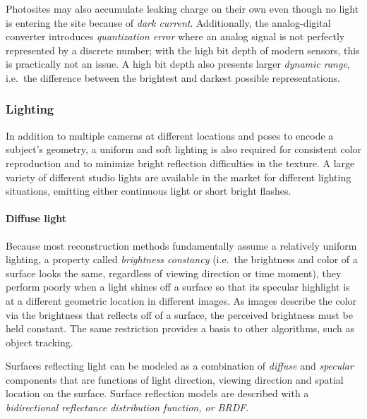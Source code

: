 Photosites may also accumulate leaking charge on their own even though no light is entering the site because of \emph{dark current}.
Additionally, the analog-digital converter introduces \emph{quantization error} where an analog signal is not perfectly represented by a discrete number; with the high bit depth of modern sensors, this is practically not an issue.
A high bit depth also presents larger \emph{dynamic range}, i.e.\ the difference between the brightest and darkest possible representations.
\cite{el2005cmos,litwiller2001ccd}



\subsubsection{Lighting} \label{sec:bg-lighting} %

In addition to multiple cameras at different locations and poses to encode a subject's geometry, a uniform and soft lighting is also required for consistent color reproduction and to minimize bright reflection difficulties in the texture.
A large variety of different studio lights are available in the market for different lighting situations, emitting either continuous light or short bright flashes.

\paragraph{Diffuse light}
Because most reconstruction methods fundamentally assume a relatively uniform lighting, a property called \emph{brightness constancy} (i.e.\ the brightness and color of a surface looks the same, regardless of viewing direction or time moment), they perform poorly when a light shines off a surface so that its specular highlight is at a different geometric location in different images.
\cite{szeliski10vision}
As images describe the color via the brightness that reflects off of a surface, the perceived brightness must be held constant.
The same restriction provides a basis to other algorithms, such as object tracking.
\cite{horn1974determining,horn1981determining}

Surfaces reflecting light can be modeled as a combination of \emph{diffuse} and \emph{specular} components that are functions of light direction, viewing direction and spatial location on the surface.
Surface reflection models are described with a \emph{bidirectional reflectance distribution function, or BRDF}. \cite{nicodemus1965directional}

